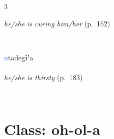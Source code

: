 \documentclass[oneside,openany]{book}%
\begin{document}
\begin{multicols}{3}
\begin{minipage}[t]{\linewidth}
\noindent \textit{he/she is curing him/her} (p.~162)
\end{minipage}\\[1em]%
\begin{minipage}[t]{\linewidth}
\raggedright\noindent \textcolor{RoyalBlue}{u}tadeg\textbf{i'}a\\
\\
\noindent \textit{he/she is thirsty} (p.~183)
\end{minipage}\\[1em]%
\end{multicols}%
\vspace{1em}%
\needspace{3in}%
\section*{Class: oh-ol-a}%
%
\needspace{1.5in}%
\end{document}
